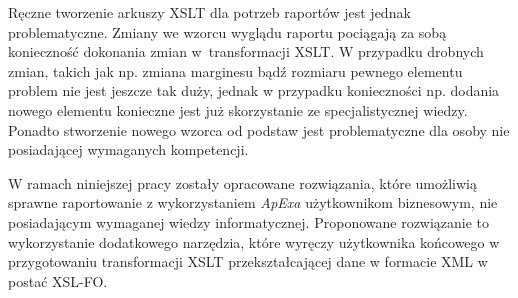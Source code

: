 \documentclass[11pt,a4paper]{article}
\begin{document}
Ręczne tworzenie arkuszy XSLT dla potrzeb raportów jest jednak problematyczne. Zmiany we wzorcu wyglądu raportu pociągają za sobą konieczność dokonania zmian w~transformacji XSLT. W przypadku drobnych zmian, takich jak np. zmiana marginesu bądź rozmiaru pewnego elementu problem nie jest jeszcze tak duży, jednak w przypadku konieczności np. dodania nowego elementu konieczne jest już skorzystanie ze specjalistycznej wiedzy. Ponadto stworzenie nowego wzorca od podstaw jest problematyczne dla osoby nie posiadającej wymaganych kompetencji.

W ramach niniejszej pracy zostały opracowane rozwiązania, które umożliwią sprawne raportowanie z wykorzystaniem \emph{ApExa} użytkownikom biznesowym, nie posiadającym wymaganej wiedzy informatycznej. Proponowane rozwiązanie to wykorzystanie dodatkowego narzędzia, które wyręczy użytkownika końcowego w przygotowaniu transformacji XSLT przekształcającej dane w formacie XML w postać XSL-FO.
\end{document}
